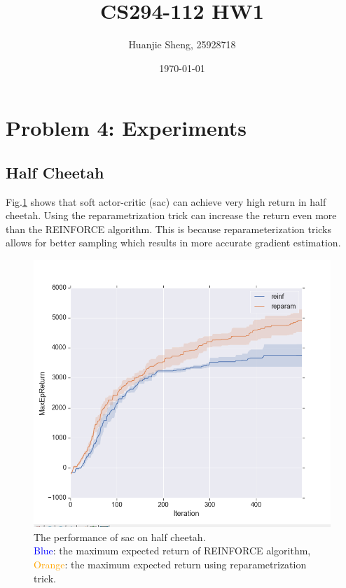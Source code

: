 \documentclass[12pt]{article}
\begin{document}
	\title{CS294-112 HW1\vspace{-2ex}}
	\author{Huanjie Sheng, 25928718\vspace{-2ex}}
	\date{\today \vspace{-2ex}}
	
	\section{Problem 4: Experiments}
	\subsection{Half Cheetah}
	Fig.\ref{fig:half_cheetah} shows that soft actor-critic (sac) can achieve very high return in half cheetah.  Using the reparametrization trick can increase the return even more than the REINFORCE algorithm.  This is because reparameterization tricks allows for better sampling which results in more accurate gradient estimation.
	\begin{figure}[!htbp] 
	 	\includegraphics[width=1.0\textwidth]{figure_1.png}
	 	\caption[caption]{The performance of sac on half cheetah. \\ \hspace{0.4\textwidth}
	 	\textcolor{blue}{Blue}: the maximum expected return of REINFORCE algorithm,\\ \hspace{0.4\textwidth}
	 	\textcolor{orange}{Orange}: the maximum expected return using reparametrization trick.\label{fig:half_cheetah}}
	\end{figure}
\end{document}
